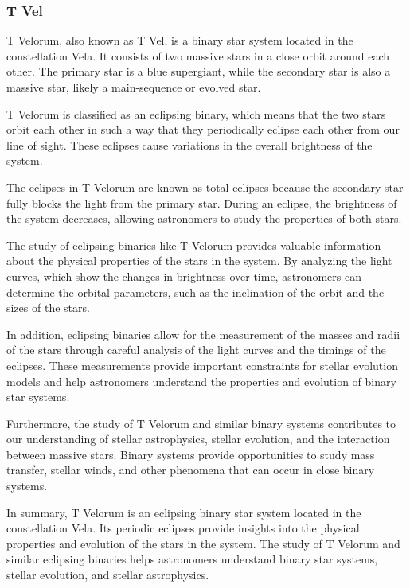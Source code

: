 \subsubsection*{ T Vel }
T Velorum, also known as T Vel, is a binary star system located in the constellation Vela. It consists of two massive stars in a close orbit around each other. The primary star is a blue supergiant, while the secondary star is also a massive star, likely a main-sequence or evolved star.

T Velorum is classified as an eclipsing binary, which means that the two stars orbit each other in such a way that they periodically eclipse each other from our line of sight. These eclipses cause variations in the overall brightness of the system.

The eclipses in T Velorum are known as total eclipses because the secondary star fully blocks the light from the primary star. During an eclipse, the brightness of the system decreases, allowing astronomers to study the properties of both stars.

The study of eclipsing binaries like T Velorum provides valuable information about the physical properties of the stars in the system. By analyzing the light curves, which show the changes in brightness over time, astronomers can determine the orbital parameters, such as the inclination of the orbit and the sizes of the stars.

In addition, eclipsing binaries allow for the measurement of the masses and radii of the stars through careful analysis of the light curves and the timings of the eclipses. These measurements provide important constraints for stellar evolution models and help astronomers understand the properties and evolution of binary star systems.

Furthermore, the study of T Velorum and similar binary systems contributes to our understanding of stellar astrophysics, stellar evolution, and the interaction between massive stars. Binary systems provide opportunities to study mass transfer, stellar winds, and other phenomena that can occur in close binary systems.

In summary, T Velorum is an eclipsing binary star system located in the constellation Vela. Its periodic eclipses provide insights into the physical properties and evolution of the stars in the system. The study of T Velorum and similar eclipsing binaries helps astronomers understand binary star systems, stellar evolution, and stellar astrophysics.




